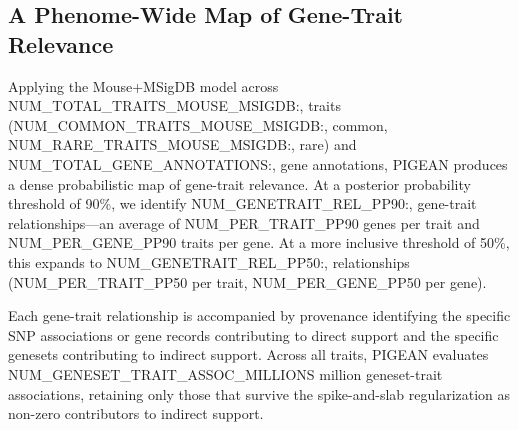 \subsection{A Phenome-Wide Map of Gene-Trait Relevance}


Applying the Mouse+MSigDB model across {{NUM_TOTAL_TRAITS_MOUSE_MSIGDB:,}} traits ({{NUM_COMMON_TRAITS_MOUSE_MSIGDB:,}} common, {{NUM_RARE_TRAITS_MOUSE_MSIGDB:,}} rare) and {{NUM_TOTAL_GENE_ANNOTATIONS:,}} gene annotations, PIGEAN produces a dense probabilistic map of gene-trait relevance. At a posterior probability threshold of 90\%, we identify {{NUM_GENETRAIT_REL_PP90:,}} gene-trait relationships---an average of {{NUM_PER_TRAIT_PP90}} genes per trait and {{NUM_PER_GENE_PP90}} traits per gene. At a more inclusive threshold of 50\%, this expands to {{NUM_GENETRAIT_REL_PP50:,}} relationships ({{NUM_PER_TRAIT_PP50}} per trait, {{NUM_PER_GENE_PP50}} per gene).


Each gene-trait relationship is accompanied by provenance identifying the specific SNP associations or gene records contributing to direct support and the specific genesets contributing to indirect support. Across all traits, PIGEAN evaluates {{NUM_GENESET_TRAIT_ASSOC_MILLIONS}} million geneset-trait associations, retaining only those that survive the spike-and-slab regularization as non-zero contributors to indirect support.



